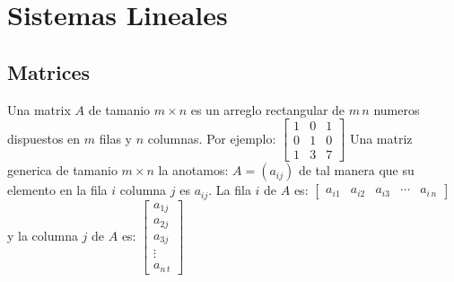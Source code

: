 %
%
%
% 
% 
%
\section{Sistemas Lineales}

\subsection{Matrices}
Una matrix $A$ de tamanio $m \times n$ es un arreglo rectangular de $m \, n$ numeros
dispuestos en $m$ filas y $n$ columnas. Por ejemplo:
$
\begin{bmatrix}
   1 & 0 & 1\\
   0 & 1 & 0 \\
   1 & 3 & 7
 \end{bmatrix}
$
Una matriz generica de tamanio $m \times n$ la anotamos: $A=(a_{ij})$ de tal manera que 
su elemento en la fila $i$ columna $j$ es $a_{ij}$. La fila $i$ de $A$ es:
$
\begin{bmatrix}
   a_{i1} & a_{i2} & a_{i3} & \cdots & a_{i\,n}
 \end{bmatrix}
$
y la columna $j$ de $A$ es:
$
\begin{bmatrix}
   a_{1j} \\ a_{2j} \\ a_{3j} \\ \vdots \\a_{n \, t}
 \end{bmatrix}
$




